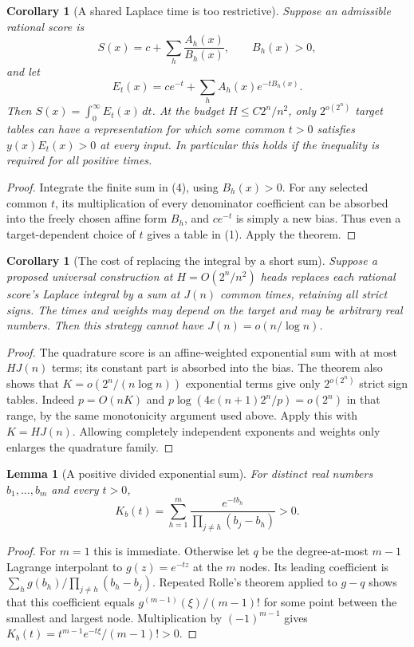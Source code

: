 \documentclass[11pt]{article}
\newtheorem{lemma}[theorem]{Lemma}
\newtheorem{corollary}[theorem]{Corollary}
\begin{document}
\begin{corollary}[A shared Laplace time is too restrictive]
Suppose an admissible rational score is
\[
 S(x)=c+\sum_h\frac{A_h(x)}{B_h(x)},\qquad B_h(x)>0,
\]
and let
\[
 E_t(x)=c e^{-t}+\sum_h A_h(x)e^{-tB_h(x)}.
\tag{4}
\]
Then $S(x)=\int_0^\infty E_t(x)\,dt$. At the budget
$H\le C2^n/n^2$, only $2^{o(2^n)}$ target tables can have a
representation for which some common $t>0$ satisfies
$y(x)E_t(x)>0$ at every input. In particular this holds if the
inequality is required for all positive times.
\end{corollary}
\begin{proof}
Integrate the finite sum in (4), using $B_h(x)>0$.
For any selected common $t$, its multiplication of every denominator
coefficient can be absorbed into the freely chosen affine form $B_h$,
and $ce^{-t}$ is simply a new bias. Thus even a target-dependent
choice of $t$ gives a table in (1). Apply the theorem.
\end{proof}

\begin{corollary}[The cost of replacing the integral by a short sum]
Suppose a proposed universal construction at $H=O(2^n/n^2)$ heads
replaces each rational score's Laplace integral by a sum at $J(n)$
common times, retaining all strict signs. The times and weights may
depend on the target and may be arbitrary real numbers. Then this
strategy cannot have $J(n)=o(n/\log n)$.
\end{corollary}
\begin{proof}
The quadrature score is an affine-weighted exponential sum with at
most $HJ(n)$ terms; its constant part is absorbed into the bias.
The theorem also shows that $K=o(2^n/(n\log n))$ exponential terms
give only $2^{o(2^n)}$ strict sign tables. Indeed $p=O(nK)$ and
$p\log(4e(n+1)2^n/p)=o(2^n)$ in that range, by the same monotonicity
argument used above. Apply this with $K=HJ(n)$. Allowing completely
independent exponents and weights only enlarges the quadrature family.
\end{proof}

\begin{lemma}[A positive divided exponential sum]
For distinct real numbers $b_1,\ldots,b_m$ and every $t>0$,
\[
 K_b(t)=\sum_{h=1}^m
       \frac{e^{-tb_h}}{\prod_{j\ne h}(b_j-b_h)}>0.
\tag{5}
\]
\end{lemma}
\begin{proof}
For $m=1$ this is immediate. Otherwise let $q$ be the degree-at-most
$m-1$ Lagrange interpolant to $g(z)=e^{-tz}$ at the $m$ nodes.
Its leading coefficient is
$\sum_h g(b_h)/\prod_{j\ne h}(b_h-b_j)$.
Repeated Rolle's theorem applied to $g-q$ shows that this coefficient
equals $g^{(m-1)}(\xi)/(m-1)!$ for some point between the smallest
and largest node. Multiplication by $(-1)^{m-1}$ gives
$K_b(t)=t^{m-1}e^{-t\xi}/(m-1)!>0$.
\end{proof}
\end{document}
